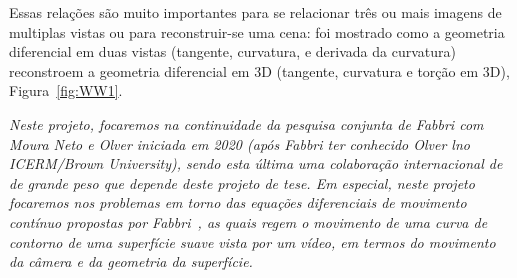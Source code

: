 \documentclass[a4paper,titlepage]{article}
\begin{document}
Essas relações são muito importantes para se relacionar três ou mais imagens 
de multiplas vistas ou para reconstruir-se uma cena: foi mostrado como 
a geometria diferencial em duas vistas (tangente, curvatura, e
derivada da curvatura) reconstroem a geometria diferencial em 3D (tangente,
curvatura e torção em 3D), Figura~\ref{fig:WW1}.

{\em
  Neste projeto, focaremos na continuidade da pesquisa conjunta de Fabbri com
  Moura Neto e Olver iniciada em 2020 (após Fabbri ter conhecido Olver lno
  ICERM/Brown University), sendo esta última uma colaboração internacional de
  de grande peso que depende deste projeto de tese. Em especial, neste projeto focaremos nos problemas em
torno das equações diferenciais de movimento contínuo propostas por Fabbri~\cite{fabbri2016multiview},
as quais regem o movimento de uma curva de contorno de uma superfície suave vista por
um vídeo, em termos do movimento da câmera e da geometria da superfície.}
\end{document}
